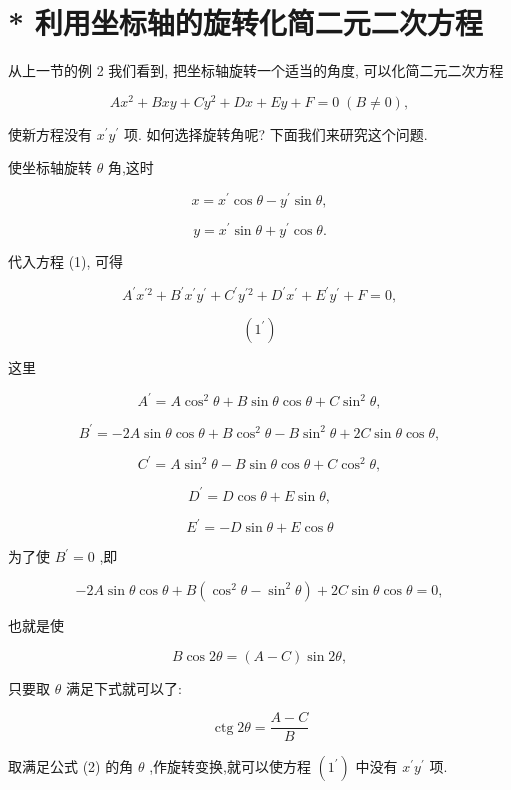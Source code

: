 \documentclass[lang=cn,newtx,10pt,scheme=chinese]{elegantbook}
\begin{document}
\section{* 利用坐标轴的旋转化简二元二次方程}

从上一节的例 2 我们看到, 把坐标轴旋转一个适当的角度, 可以化简二元二次方程

\[
  A{x}^{2} + {Bxy} + C{y}^{2} + {Dx} + {Ey} + F = 0\;\left( {B \neq 0}\right) , \tag{1}
\]

使新方程没有 \({x}^{\prime }{y}^{\prime }\) 项. 如何选择旋转角呢? 下面我们来研究这个问题.

使坐标轴旋转 \(\theta\) 角,这时

\[
  x = {x}^{\prime }\cos \theta - {y}^{\prime }\sin \theta ,
\]

\[
  y = {x}^{\prime }\sin \theta + {y}^{\prime }\cos \theta .
\]

代入方程 (1), 可得

\[
    {A}^{\prime }{x}^{\prime 2} + {B}^{\prime }{x}^{\prime }{y}^{\prime } + {C}^{\prime }{y}^{\prime 2} + {D}^{\prime }{x}^{\prime } + {E}^{\prime }{y}^{\prime } + F = 0,
\]

\[
  \left( {1}^{\prime }\right)
\]

这里

\[
    {A}^{\prime } = A{\cos }^{2}\theta + B\sin \theta \cos \theta + C{\sin }^{2}\theta ,
\]

\[
    {B}^{\prime } = - {2A}\sin \theta \cos \theta + B{\cos }^{2}\theta - B{\sin }^{2}\theta + {2C}\sin \theta \cos \theta ,
\]

\[
    {C}^{\prime } = A{\sin }^{2}\theta - B\sin \theta \cos \theta + C{\cos }^{2}\theta ,
\]

\[
    {D}^{\prime } = D\cos \theta + E\sin \theta ,
\]

\[
    {E}^{\prime } = - D\sin \theta + E\cos \theta
\]

为了使 \({B}^{\prime } = 0\) ,即

\[
  - {2A}\sin \theta \cos \theta + B\left( {{\cos }^{2}\theta - {\sin }^{2}\theta }\right) + {2C}\sin \theta \cos \theta = 0,
\]

也就是使

\[
  B\cos {2\theta } = \left( {A - C}\right) \sin {2\theta },
\]

只要取 \(\theta\) 满足下式就可以了:

\[
  \operatorname{ctg}{2\theta } = \frac{A - C}{B} \tag{2}
\]

取满足公式 (2) 的角 \(\theta\) ,作旋转变换,就可以使方程 \(\left( {1}^{\prime }\right)\) 中没有 \({x}^{\prime }{y}^{\prime }\) 项.
\end{document}
